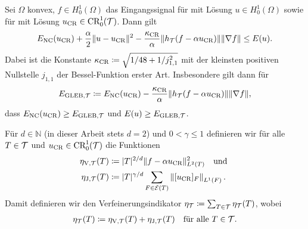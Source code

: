 \begin{theorem}
  \label{thm:gleb}
  Sei $\Omega$ konvex, $f\in H^1_0(\Omega)$ das Eingangssignal für
   mit Lösung $u\in H^1_0(\Omega)$ sowie für
   mit Lösung $u_\textup{CR}\in \textup{CR}^1_0(\mathcal{T})$.
  Dann gilt
  \begin{align*}
    E_\textup{NC}(u_\textup{CR})+\frac{\alpha}{2}\Vert u-u_\textup{CR}\Vert^2
    -\frac{\kappa_{\textup{CR}}}{\alpha}\Vert
    h_{\mathcal{T}}(f-\alpha u_\textup{CR})\Vert \Vert\nabla f\Vert\leq E(u).
  \end{align*}
  Dabei ist die Konstante $\kappa_{\textup{CR}}\coloneqq\sqrt{1/48+1/j_{1,1}^2}$ mit der
  kleinsten positiven Nullstelle $j_{1,1}$ der Bessel-Funktion erster Art.
  Insbesondere gilt dann für 
  \begin{align}
    \label{eq:gleb}
    E_{\textup{GLEB}, \mathcal{T}} 
    \coloneqq 
    E_\textup{NC}(u_\textup{CR}) - \frac{\kappa_{\textup{CR}}}{\alpha}\Vert h_{\mathcal{T}}(f-\alpha u_\textup{CR})\Vert
    \Vert \nabla f\Vert,
  \end{align}
    dass $E_\textup{NC}(u_\textup{CR})\geq E_{\textup{GLEB}, \mathcal{T}}$ und $E(u)\geq E_{\textup{GLEB}, \mathcal{T}}$.
\end{theorem}

\begin{definition}[Verfeinerungsindikator]
  \label{def:refinementIndicator}
  Für $d\in\mathbb{N}$ (in dieser Arbeit stets $d=2$) und $0<\gamma\leq 1$
  definieren wir für alle $T\in\mathcal{T}$ und $u_\textup{CR}\in\textup{CR}^1_0(\mathcal{T})$ die
  Funktionen
  \begin{align*}
    \eta_{\textup{V}, \mathcal{T}}(T)
    &\coloneqq
    |T|^{2/d}\Vert f-\alpha u_\textup{CR}\Vert^2_{L^2(T)}\quad\text{und }\\
    \eta_{\textup{J}, \mathcal{T}}(T)
    &\coloneqq
    |T|^{\gamma/d}\sum_{F\in\mathcal{E}(T)}\left\Vert [u_\textup{CR}]_F\right\Vert_{L^1(F)}.
  \end{align*} 
  Damit definieren wir den Verfeinerungsindikator
  $\eta_{\mathcal{T}}\coloneqq\sum_{T\in\mathcal{T}}\eta_{\mathcal{T}}(T)$, wobei
  \begin{align} \label{eq:refinementIndicator} 
    \eta_{\mathcal{T}} (T)
    \coloneqq
    \eta_{\textup{V}, \mathcal{T}}(T) + 
    \eta_{\textup{J}, \mathcal{T}}(T)\quad\text{für alle } T\in\mathcal{T}.
  \end{align} 
\end{definition}


